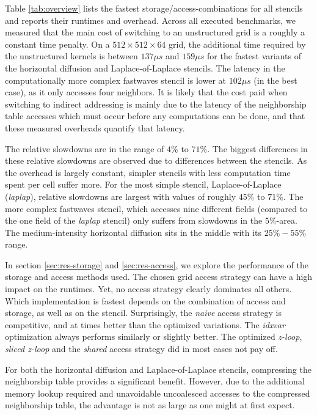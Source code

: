 Table \ref{tab:overview} lists the fastest storage/access-combinations for all stencils and reports their runtimes and overhead. Across all executed benchmarks, we measured that the main cost of switching to an unstructured grid is a roughly a constant time penalty. On a $512\times 512\times 64$ grid, the additional time required by the unstructured kernels is between $137 \mu s$ and $159 \mu s$ for the fastest variants of the horizontal diffusion and Laplace-of-Laplace stencils. The latency in the computationally more complex fastwaves stencil is lower at $102 \mu s$ (in the best case), as it only accesses four neighbors. It is likely that the cost paid when switching to indirect addressing is mainly due to the latency of the neighborship table accesses which must occur before any computations can be done, and that these measured overheads quantify that latency.

The relative slowdowns are in the range of $4\%$ to $71\%$. The biggest differences in these relative slowdowns are observed due to differences between the stencils. As the overhead is largely constant, simpler stencils with less computation time spent per cell suffer more. For the most simple stencil, Laplace-of-Laplace (\emph{laplap}), relative slowdowns are largest with values of roughly $45\%$ to $71\%$. The more complex fastwaves stencil, which accesses nine different fields (compared to the one field of the \emph{laplap} stencil) only suffers from slowdowns in the $5\%$-area. The medium-intensity horizontal diffusion sits in the middle with its $25\% - 55\%$ range. 

In section \ref{sec:res-storage} and \ref{sec:res-access}, we explore the performance of the storage and access methods used. The chosen grid access strategy can have a high impact on the runtimes. Yet, no access strategy clearly dominates all others. Which implementation is fastest depends on the combination of access and storage, as well as on the stencil. Surprisingly, the \emph{naive} access strategy is competitive, and at times better than the optimized variations. The \emph{idxvar} optimization always performs similarly or slightly better. The optimized \emph{z-loop}, \emph{sliced z-loop} and the \emph{shared} access strategy did in most cases not pay off.

For both the horizontal diffusion and Laplace-of-Laplace stencils, compressing the neighborship table provides a significant benefit. However, due to the additional memory lookup required and unavoidable uncoalesced accesses to the compressed neighborship table, the advantage is not as large as one might at first expect.

